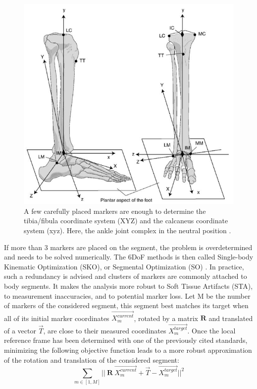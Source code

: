 \newpage

\begin{figure}[!ht]
	\centering
	\def\svgwidth{1\columnwidth}
	\fontsize{10pt}{10pt}\selectfont
	\includegraphics[width=0.7\linewidth]{"../Chap2/Figures/ISBaxis.PNG"}
	\caption{A few carefully placed markers are enough to determine the tibia/fibula coordinate system (XYZ) and the calcaneus coordinate system (xyz). Here, the ankle joint complex in the neutral position \cite{Wu2002}.}
	\label{fig_isb}
\end{figure}

If more than 3 markers are placed on the segment, the problem is overdetermined and needs to be solved numerically. The 6DoF methods is then called Single-body Kinematic Optimization (SKO), or Segmental Optimization (SO) \cite{Lu1999}. In practice, such a redundancy is advised and clusters of markers are commonly attached to body segments. It makes the analysis more robust to Soft Tissue Artifacts (STA), to measurement inaccuracies, and to potential marker loss. Let M be the number of markers of the considered segment, this segment best matches its target when all of its initial marker coordinates $\overrightarrow{X^{current}_m}$, rotated by a matrix $\textbf{R}$ and translated of a vector $\overrightarrow{T}$, are close to their measured coordinates $\overrightarrow{X^{target}_m}$. Once the local reference frame has been determined with one of the previously cited standards, minimizing the following objective function leads to a more robust approximation of the rotation and translation of the considered segment: 
\begin{equation}
  \sum_{m \in [1,M]}
  ||\ \textbf{R} \ \overrightarrow{X^{current}_m} + \overrightarrow{T} - \overrightarrow{X^{target}_m} ||^2
\end{equation} 

